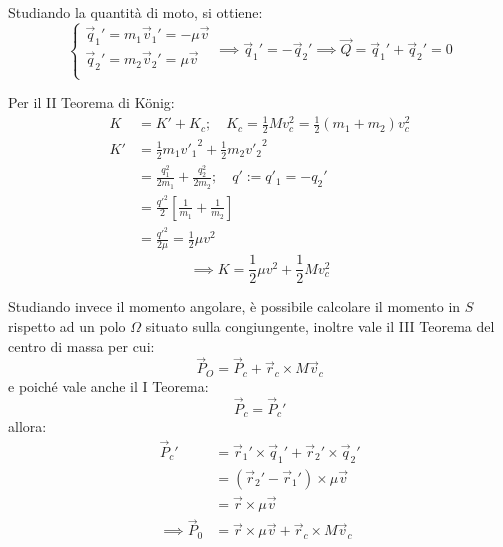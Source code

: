 \documentclass[11pt, a4paper, openright]{book}
\theoremstyle{plain}
\theoremstyle{definition}
\begin{document}
Studiando la quantità di moto, si ottiene:
\begin{equation}
    \begin{cases}
        \vec{q}_1' = m_1\vec{v}_1' = -\mu \vec{v} \\
        \vec{q}_2' = m_2\vec{v}_2' = \mu \vec{v} \\ 
    \end{cases} \implies \vec{q}_1' = - \vec{q}_2' \implies \vec{Q} = \vec{q}_1' + \vec{q}_2' = 0
\end{equation}

Per il II Teorema di K\"onig:
\begin{align}
    K & = K' + K_c; \quad K_c = \frac{1}{2}Mv_c^2 = \frac{1}{2}(m_1 + m_2)v_c^2 \\
    K' & = \frac{1}{2}m_1 {v'_1}^{2} + \frac{1}{2}m_2 {v'_2}^{2} \\
       & = \frac{q_1^2}{2m_1} + \frac{q_2^2}{2m_2}; \quad q' := q'_1 = -q_2' \\
       & = \frac{q'^2}{2}\left[\frac{1}{m_1} + \frac{1}{m_2}\right] \\
       & = \frac{q'^2}{2\mu} = \frac{1}{2}\mu v^2
\end{align}
\begin{equation}
    \implies K = \frac{1}{2}\mu v^2 + \frac{1}{2}Mv_c^2
\end{equation}

Studiando invece il momento angolare, è possibile calcolare il momento in $S$ rispetto ad un polo $\Omega$ situato sulla congiungente, inoltre vale il III Teorema del centro di massa per cui:
\begin{equation}
    \vec{P}_O = \vec{P}_c + \vec{r}_c \times M \vec{v}_c
\end{equation}
e poiché vale anche il I Teorema:
\begin{equation}
    \vec{P}_c = \vec{P}_c'
\end{equation}
allora:
\begin{align}
    \vec{P}_c' & = \vec{r}_1' \times \vec{q}_1' + \vec{r}_2' \times \vec{q}_2' \\
               & = (\vec{r}_2' - \vec{r}_1') \times \mu \vec{v} \\
               & = \vec{r} \times \mu \vec{v} \\
    \implies \vec{P}_0 & = \vec{r} \times \mu \vec{v} + \vec{r}_c \times M\vec{v}_c
\end{align}
\end{document}
